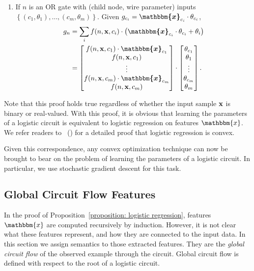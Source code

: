 \documentclass[letterpaper]{article} %
\newcommand{\node}{n}
\newcommand{\coe}{g}
\newcommand{\citet}[1]{\citeauthor{#1}~(\citeyear{#1})}
\begin{document}
\begin{itemize}
\begin{enumerate}[wide=0pt, leftmargin=\dimexpr\labelwidth + 2\labelsep\relax]
\item If $\node$ is an OR gate with (child node, wire parameter) inputs $\left\{(c_1,\theta_1),\dots,(c_m,\theta_m)\right\}$. Given $\coe_{c_i} =  \bm{\mathbbm{x}}_{c_i} \cdot \theta_{c_i}$,
\begin{align*}
\coe_\node & = \sum_i  f(n,{\bf x},c_i) \cdot \left( \bm{\mathbbm{x}}_{c_i} \cdot \theta_{c_i}+ \theta_i\right) \\
&= \begin{bmatrix}
 f(n,{\bf x},c_1) \cdot\bm{\mathbbm{x}}_{c_1} \\
 f(n,{\bf x},c_1) \\
\vdots \\
 f(n,{\bf x},c_m) \cdot\bm{\mathbbm{x}}_{c_m} \\
 f(n,{\bf x},c_m)
\end{bmatrix}
\cdot
 \begin{bmatrix}
\theta_{c_1} \\
\theta_1\\
\vdots \\
\theta_{c_m} \\
\theta_m
\end{bmatrix}.
\end{align*}
\end{enumerate}
\end{itemize}

Note that this proof holds true regardless of whether the input sample ${\bf x}$ is binary or real-valued.
With this proof, it is obvious that learning the parameters of a logistic circuit is equivalent to logistic regression on features $\mathbbm{x}$.
We refer readers to \citet{Rennie2005} for a detailed proof that logistic regression is convex.

Given this correspondence, any convex optimization technique can now be brought to bear on the problem of learning the parameters of a logistic circuit. In particular, we use stochastic gradient descent for this task.


\subsection{Global Circuit Flow Features}

In the proof of Proposition~\ref{proposition: logistic regression}, features $\mathbbm{x}$  are computed recursively by induction. However, it is not clear what these features represent, and how they are connected to the input data. In this section we assign semantics to those extracted features. They are the \emph{global circuit flow} of the observed example through the circuit. Global circuit flow is defined with respect to the root of a logistic circuit.
\end{document}
